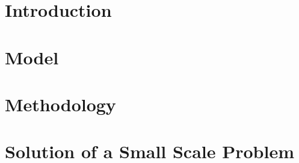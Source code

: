 \documentclass[12pt]{report}
\begin{document}
    
    
    \chapter{Introduction}
        \doublespacing
        
    
    \singlespacing
    \chapter{Model}
        \doublespacing
        
    
    \singlespacing
    \chapter{Methodology}
        \doublespacing
        
        
    \singlespacing
    \chapter{Solution of a Small Scale Problem}
        \doublespacing
        
        
    \newpage
    
    
    
\end{document}
